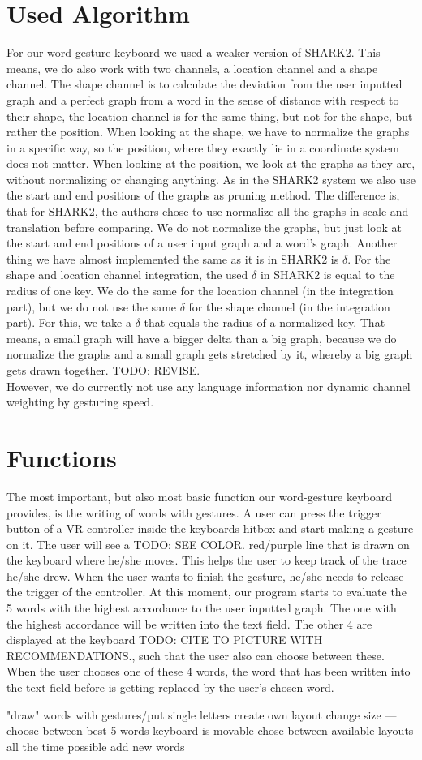 \section{Used Algorithm}
For our word-gesture keyboard we used a weaker version of SHARK2. This means, we do also work with two channels, a location channel and a shape channel. The shape channel is to calculate the deviation from the user inputted graph and a perfect graph from a word in the sense of distance with respect to their shape, the location channel is for the same thing, but not for the shape, but rather the position. When looking at the shape, we have to normalize the graphs in a specific way, so the position, where they exactly lie in a coordinate system does not matter. When looking at the position, we look at the graphs as they are, without normalizing or changing anything. As in the SHARK2 system we also use the start and end positions of the graphs as pruning method. The difference is, that for SHARK2, the authors chose to use normalize all the graphs in scale and translation before comparing. We do not normalize the graphs, but just look at the start and end positions of a user input graph and a word's graph. Another thing we have almost implemented the same as it is in SHARK2 is $\delta$. For the shape and location channel integration, the used $\delta$ in SHARK2 is equal to the radius of one key. We do the same for the location channel (in the integration part), but we do not use the same $\delta$ for the shape channel (in the integration part). For this, we take a $\delta$ that equals the radius of a normalized key. That means, a small graph will have a bigger delta than a big graph, because we do normalize the graphs and a small graph gets stretched by it, whereby a big graph gets drawn together. TODO: REVISE.\\
However, we do currently not use any language information nor dynamic channel weighting by gesturing speed.

\section{Functions}
The most important, but also most basic function our word-gesture keyboard provides, is the writing of words with gestures. A user can press the trigger button of a VR controller inside the keyboards hitbox and start making a gesture on it. The user will see a TODO: SEE COLOR. red/purple line that is drawn on the keyboard where he/she moves. This helps the user to keep track of the trace he/she drew. When the user wants to finish the gesture, he/she needs to release the trigger of the controller. At this moment, our program starts to evaluate the 5 words with the highest accordance to the user inputted graph. The one with the highest accordance will be written into the text field. The other 4 are displayed at the keyboard TODO: CITE TO PICTURE WITH RECOMMENDATIONS., such that the user also can choose between these. When the user chooses one of these 4 words, the word that has been written into the text field before is getting replaced by the user's chosen word.

"draw" words with gestures/put single letters
create own layout
change size
---choose between best 5 words
keyboard is movable
chose between available layouts all the time possible
add new words
